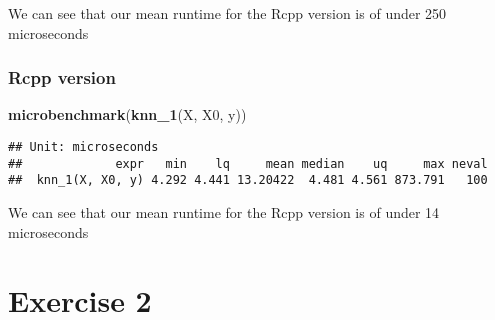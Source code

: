 \documentclass[]{article}
\newenvironment{Shaded}{\begin{snugshade}}{\end{snugshade}}
\newcommand{\KeywordTok}[1]{\textcolor[rgb]{0.13,0.29,0.53}{\textbf{#1}}}
\newcommand{\NormalTok}[1]{#1}
\begin{document}
We can see that our mean runtime for the Rcpp version is of under 250
microseconds

\hypertarget{rcpp-version}{%
\subsubsection{Rcpp version}\label{rcpp-version}}

\begin{Shaded}
\begin{Highlighting}[]
\KeywordTok{microbenchmark}\NormalTok{(}\KeywordTok{knn_1}\NormalTok{(X, X0, y))}
\end{Highlighting}
\end{Shaded}

\begin{verbatim}
## Unit: microseconds
##             expr   min    lq     mean median    uq     max neval
##  knn_1(X, X0, y) 4.292 4.441 13.20422  4.481 4.561 873.791   100
\end{verbatim}

We can see that our mean runtime for the Rcpp version is of under 14
microseconds

\newpage

\hypertarget{exercise-2}{%
\section{Exercise 2}\label{exercise-2}}
\end{document}
